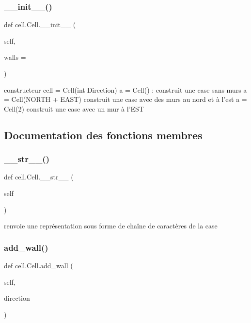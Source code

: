 \subsubsection{\texorpdfstring{\+\_\+\+\_\+init\+\_\+\+\_\+()}{\_\_init\_\_()}}
{\footnotesize\ttfamily def cell.\+Cell.\+\_\+\+\_\+init\+\_\+\+\_\+ (\begin{DoxyParamCaption}\item[{}]{self,  }\item[{}]{walls = {} }\end{DoxyParamCaption})}

\begin{DoxyVerb}constructeur 
cell = Cell(int|Direction) 
a = Cell() : construit une case sans murs
a = Cell(NORTH + EAST) construit une case avec des murs au nord et à l'est
a = Cell(2) construit une case avec un mur à l'EST
\end{DoxyVerb}
 

\subsection{Documentation des fonctions membres}
\mbox{\label{classcell_1_1Cell_a8f5a44a2e36ebbcf8c0978cb7dc888f1}} 
\subsubsection{\texorpdfstring{\+\_\+\+\_\+str\+\_\+\+\_\+()}{\_\_str\_\_()}}
{\footnotesize\ttfamily def cell.\+Cell.\+\_\+\+\_\+str\+\_\+\+\_\+ (\begin{DoxyParamCaption}\item[{}]{self }\end{DoxyParamCaption})}

\begin{DoxyVerb}renvoie une représentation sous forme de chaîne de caractères de la case
\end{DoxyVerb}
 \mbox{\label{classcell_1_1Cell_a73e53012b8b7e114778e08e38c2524a6}} 
\subsubsection{\texorpdfstring{add\+\_\+wall()}{add\_wall()}}
{\footnotesize\ttfamily def cell.\+Cell.\+add\+\_\+wall (\begin{DoxyParamCaption}\item[{}]{self,  }\item[{}]{direction }\end{DoxyParamCaption})}

